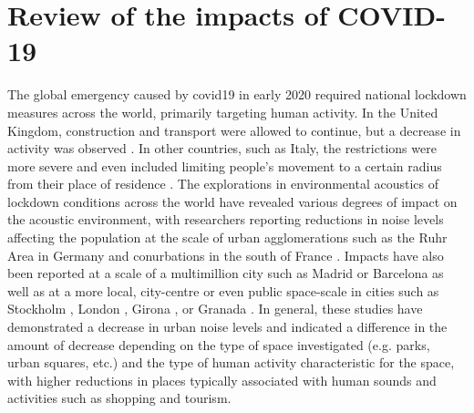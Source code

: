 

\section{Review of the impacts of COVID-19}
 \label{sec:covidReview}
 The global emergency caused by \gls{covid19} in early 2020 required national lockdown measures across the world, primarily targeting human activity. In the United Kingdom, construction and transport were allowed to continue, but a decrease in activity was observed \citep{Hadjidemetriou2020impact}. In other countries, such as Italy, the restrictions were more severe and even included limiting people's movement to a certain radius from their place of residence \citep{Ren2020Pandemic}. The explorations in environmental acoustics of lockdown conditions across the world have revealed various degrees of impact on the acoustic environment, with researchers reporting reductions in noise levels affecting the population at the scale of urban agglomerations such as the Ruhr Area in Germany \citep{Hornberg2021Impact} and conurbations in the south of France \citep{Munoz2020Lockdown}. Impacts have also been reported at a scale of a multimillion city such as Madrid \citep{Asensio2020Changes} or Barcelona \citep{BonetSola2021Soundscape} as well as at a more local, city-centre or even public space-scale in cities such as Stockholm \citep{Rumpler2021Noise}, London \citep{Aletta2020Assessing}, Girona \citep{AlsinaPages2021Changes}, or Granada \citep{VidaManzano2021sound}. In general, these studies have demonstrated a decrease in urban noise levels and indicated a difference in the amount of decrease depending on the type of space investigated (e.g. parks, urban squares, etc.) and the type of human activity characteristic for the space, with higher reductions in places typically associated with human sounds and activities such as shopping and tourism.

